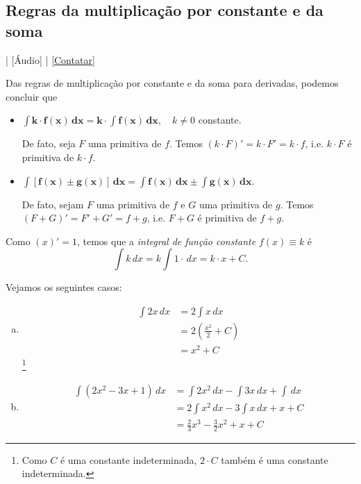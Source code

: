 \subsection{Regras da multiplicação por constante e da soma}

\begin{flushright}
  [Vídeo] | [Áudio] | \href{https://phkonzen.github.io/notas/contato.html}{[Contatar]}
\end{flushright}

Das regras de multiplicação por constante e da soma para derivadas, podemos concluir que
\begin{itemize}
\item $\displaystyle \pmb{\int k\cdot f(x)\,dx = k\cdot \int f(x)\,dx},\quad k\neq 0$ constante.

  De fato, seja $F$ uma primitiva de $f$. Temos $(k\cdot F)' = k\cdot F' = k\cdot f$, i.e. $k\cdot F$ é primitiva de $k\cdot f$.
  
\item $\displaystyle \pmb{\int \left[f(x)\pm g(x)\right]\,dx = \int f(x)\,dx \pm \int g(x)\,dx}$.

  De fato, sejam $F$ uma primitiva de $f$ e $G$ uma primitiva de $g$. Temos $(F + G)' = F' + G' = f + g$, i.e. $F + G$ é primitiva de $f+g$.
\end{itemize}

\begin{obs}
  Como $(x)' = 1$, temos que a \emph{integral de função constante} $f(x)\equiv k$ é
  \begin{equation}
    \int k\,dx = k\int 1\cdot\,dx = k\cdot x + C.
  \end{equation}
\end{obs}

\begin{ex}
  Vejamos os seguintes casos:
  \begin{enumerate}[a)]
  \item
    \begin{align}
      \int 2x\,dx &= 2\int x\,dx \\
                  &= 2 \left(\frac{x^2}{2} + C\right) \\
                  &= x^2 + C
    \end{align}\footnote{Como $C$ é uma constante indeterminada, $2\cdot C$ também é uma constante indeterminada.}
  \item
    \begin{align}
      \int (2x^2 - 3x + 1)\,dx &= \int 2x^2\,dx - \int 3x\,dx + \int \,dx \\
                               &= 2\int x^2\,dx - 3\int x\,dx + x + C \\
                               &= \frac{2}{3}x^3 - \frac{3}{2}x^2 + x + C
    \end{align}
  \end{enumerate}
\end{ex}

